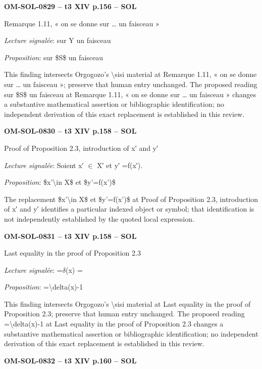 \par\noindent\textbf{OM-SOL-0829 -- t3 XIV p.156 -- SOL}\par
Remarque 1.11, « on se donne sur … un faisceau »\par
\emph{Lecture signalée}: sur Y un faisceau\par
\emph{Proposition}: sur \$S\$ un faisceau\par
This finding intersects Orgogozo's \textbackslash{}sisi material at Remarque 1.11, « on se donne sur … un faisceau »; preserve that human entry unchanged. The proposed reading sur \$S\$ un faisceau at Remarque 1.11, « on se donne sur … un faisceau » changes a substantive mathematical assertion or bibliographic identification; no independent derivation of this exact replacement is established in this review.\par
\par\noindent\textbf{OM-SOL-0830 -- t3 XIV p.158 -- SOL}\par
Proof of Proposition 2.3, introduction of x′ and y′\par
\emph{Lecture signalée}: Soient x′ \ensuremath{\in} X′ et y′ =\allowbreak  f(x′).\par
\emph{Proposition}: \$x'\textbackslash{}in X\$ et \$y'=\allowbreak f(x')\$\par
The replacement \$x'\textbackslash{}in X\$ et \$y'=\allowbreak f(x')\$ at Proof of Proposition 2.3, introduction of x′ and y′ identifies a particular indexed object or symbol; that identification is not independently established by the quoted local expression.\par
\par\noindent\textbf{OM-SOL-0831 -- t3 XIV p.158 -- SOL}\par
Last equality in the proof of Proposition 2.3\par
\emph{Lecture signalée}: =\allowbreak  \ensuremath{\delta}(x) =\par
\emph{Proposition}: =\allowbreak \textbackslash{}delta(x)-1\par
This finding intersects Orgogozo's \textbackslash{}sisi material at Last equality in the proof of Proposition 2.3; preserve that human entry unchanged. The proposed reading =\allowbreak \textbackslash{}delta(x)-1 at Last equality in the proof of Proposition 2.3 changes a substantive mathematical assertion or bibliographic identification; no independent derivation of this exact replacement is established in this review.\par
\par\noindent\textbf{OM-SOL-0832 -- t3 XIV p.160 -- SOL}\par
